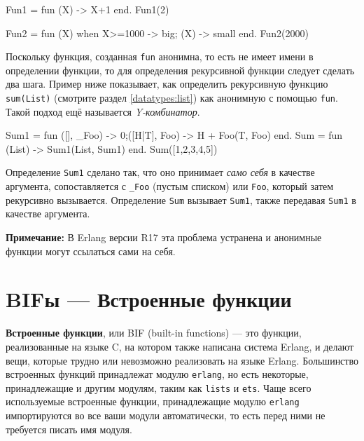 \begin{erlang}
Fun1 = fun (X) -> X+1 end.
Fun1(2)         %

Fun2 = fun (X) when X>=1000 -> big; (X) -> small end.
Fun2(2000)      %
\end{erlang}

Поскольку функция, созданная  \texttt{fun} анонимна, то есть не имеет имени в 
определении функции, то для определения рекурсивной функции следует сделать два
шага.  Пример ниже показывает, как определить рекурсивную функцию 
\texttt{sum(List)} (смотрите раздел \ref{datatypes:list}) как анонимную с помощью
\texttt{fun}. Такой подход ещё называется \emph{Y-комбинатор}.

\begin{erlang}
Sum1 = fun ([], _Foo) -> 0;([H|T], Foo) -> H + Foo(T, Foo) end.
Sum = fun (List) -> Sum1(List, Sum1) end.
Sum([1,2,3,4,5])    %
\end{erlang}

Определение \texttt{Sum1} сделано так, что оно принимает \emph{само себя} в
качестве аргумента, сопоставляется с \texttt{\_Foo} (пустым списком) или
\texttt{Foo}, который затем рекурсивно вызывается.  Определение \texttt{Sum} 
вызывает \texttt{Sum1}, также передавая \texttt{Sum1} в качестве аргумента.

\textbf{Примечание: }В Erlang версии R17 эта проблема устранена и анонимные 
функции могут ссылаться сами на себя.



\section{BIFы --- Встроенные функции}
\label{functions:bifs}

\textbf{Встроенные функции}, или BIF (built-in functions) --- это функции, 
реализованные на языке C, на котором также написана система Erlang, и делают вещи,
которые трудно или невозможно реализовать на языке Erlang.  Большинство встроенных
функций принадлежат модулю \texttt{erlang}, но есть некоторые, принадлежащие и
другим модулям, таким как \texttt{lists} и \texttt{ets}. Чаще всего используемые
встроенные функции, принадлежащие модулю \texttt{erlang} импортируются во все
ваши модули автоматически, то есть перед ними не требуется писать имя модуля.

